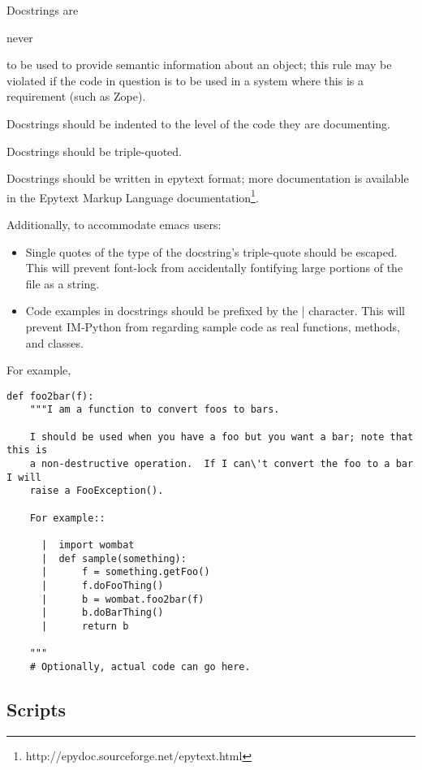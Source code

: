 Docstrings are \begin{em}never\end{em} to be used to provide semantic     information about an object; this rule may be violated if the     code in question is to be used in a system where this is a     requirement (such as Zope).

Docstrings should be indented to the level of the code they     are documenting.

Docstrings should be triple-quoted.

Docstrings should be written in epytext format; more     documentation is available in the     Epytext Markup Language documentation\footnote{http://epydoc.sourceforge.net/epytext.html}.

Additionally, to accommodate emacs users:\begin{itemize}
\item Single quotes of the type of the docstring's triple-quote       should be escaped. This will prevent font-lock from       accidentally fontifying large portions of the file as a       string.
\item Code examples in docstrings should be prefixed by the |       character. This will prevent IM-Python from regarding sample       code as real functions, methods, and classes.
\end{itemize}


For example,\begin{verbatim}
def foo2bar(f):
    """I am a function to convert foos to bars.

    I should be used when you have a foo but you want a bar; note that this is
    a non-destructive operation.  If I can\'t convert the foo to a bar I will
    raise a FooException().

    For example::

      |  import wombat
      |  def sample(something):
      |      f = something.getFoo()
      |      f.doFooThing()
      |      b = wombat.foo2bar(f)
      |      b.doBarThing()
      |      return b

    """
    # Optionally, actual code can go here.
\end{verbatim}


\subsection{Scripts}


